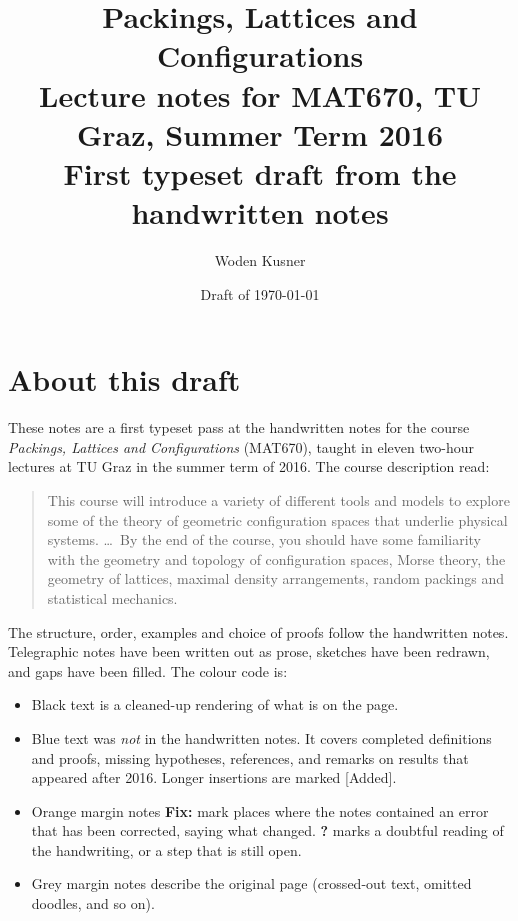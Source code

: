 \documentclass[11pt,openany]{book}
\title{\textbf{Packings, Lattices and Configurations}\\[0.6em]
\large Lecture notes for MAT670, TU Graz, Summer Term 2016\\[0.3em]
\normalsize First typeset draft from the handwritten notes}
\author{Woden Kusner}
\date{Draft of \today}
\theoremstyle{plain}
\theoremstyle{definition}
\theoremstyle{remark}
\newcommand{\added}[1]{{\color{addcol}#1}}
\begin{document}
\frontmatter
\maketitle

\chapter*{About this draft}

These notes are a first typeset pass at the handwritten notes for the course
\emph{Packings, Lattices and Configurations} (MAT670), taught in eleven two-hour lectures at TU Graz
in the summer term of 2016. The course description read:
\begin{quote}
This course will introduce a variety of different tools and models to explore some of the theory of
geometric configuration spaces that underlie physical systems. \dots\ By the end of the course, you
should have some familiarity with the geometry and topology of configuration spaces, Morse theory, the
geometry of lattices, maximal density arrangements, random packings and statistical mechanics.
\end{quote}

The structure, order, examples and choice of proofs follow the handwritten notes. Telegraphic notes have
been written out as prose, sketches have been redrawn, and gaps have been filled. The colour code is:

\begin{itemize}
\item Black text is a cleaned-up rendering of what is on the page.
\item \added{Blue text} was \emph{not} in the handwritten notes. It covers completed definitions and
  proofs, missing hypotheses, references, and remarks on results that appeared after 2016.
  Longer insertions are marked \added{\textsf{\small[Added]}}.
\item Orange margin notes \textbf{Fix:} mark places where the notes contained an error that has been
  corrected, saying what changed. \textbf{?} marks a doubtful reading of the handwriting,
  or a step that is still open.
\item Grey margin notes describe the original page (crossed-out text, omitted doodles, and so on).
\end{itemize}
\end{document}
